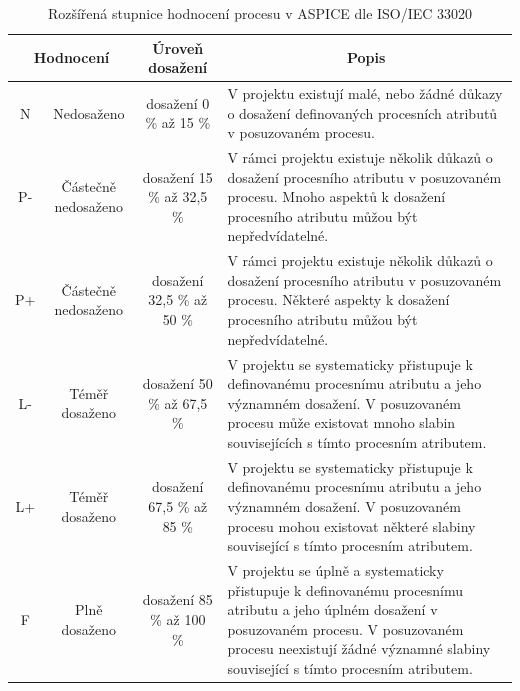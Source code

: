 \documentclass[czech,master,public,dept460,male,cpdeclaration,oneside]{diploma}
\begin{document}
\begin{table}[htp]
\begin{center}
\begin{tabular}{c | c | c | m{6cm}}

\multicolumn{2}{c|}{\textbf{Hodnocení}} & \multicolumn{1}{c|}{\textbf{Úroveň dosažení}} & \multicolumn{1}{c}{\textbf{Popis}} \\ 
\hline
\hline
N  & Nedosaženo & dosažení 0 \% až 15 \% & V projektu existují malé, nebo žádné důkazy o dosažení definovaných procesních atributů v posuzovaném procesu. \\ 
\hline
P- & Částečně nedosaženo & dosažení 15 \% až  32,5 \% & V rámci projektu existuje několik důkazů o dosažení procesního atributu v posuzovaném procesu. Mnoho aspektů k dosažení procesního atributu můžou být nepředvídatelné. \\ 
\hline
P+ & Částečně nedosaženo & dosažení  32,5 \% až 50 \% & V rámci projektu existuje několik důkazů o dosažení procesního atributu v posuzovaném procesu. Některé aspekty k dosažení procesního atributu můžou být nepředvídatelné. \\ 
\hline
L- & Téměř dosaženo & dosažení  50 \% až 67,5 \% & V projektu se systematicky přistupuje k  definovanému procesnímu atributu a jeho významném dosažení. V posuzovaném procesu může existovat mnoho slabin souvisejících s tímto procesním atributem. \\ 
\hline
L+ & Téměř dosaženo  & dosažení  67,5 \% až 85 \% & V projektu se systematicky přistupuje k definovanému procesnímu atributu a jeho významném dosažení. V posuzovaném procesu mohou existovat některé slabiny související s tímto procesním atributem. \\ 
\hline
F  & Plně dosaženo & dosažení  85 \% až 100 \% & V projektu se úplně a systematicky přistupuje k definovanému procesnímu atributu a jeho úplném dosažení v posuzovaném procesu. V posuzovaném procesu neexistují žádné významné slabiny související s tímto procesním atributem. \\ 
\end{tabular}
\caption{Rozšířená stupnice hodnocení procesu v ASPICE dle ISO/IEC 33020 \cite{ref:aspice_download_1523}}
\label{tab:aspice_rating_scale}
\end{center}
\end{table}
\end{document}

